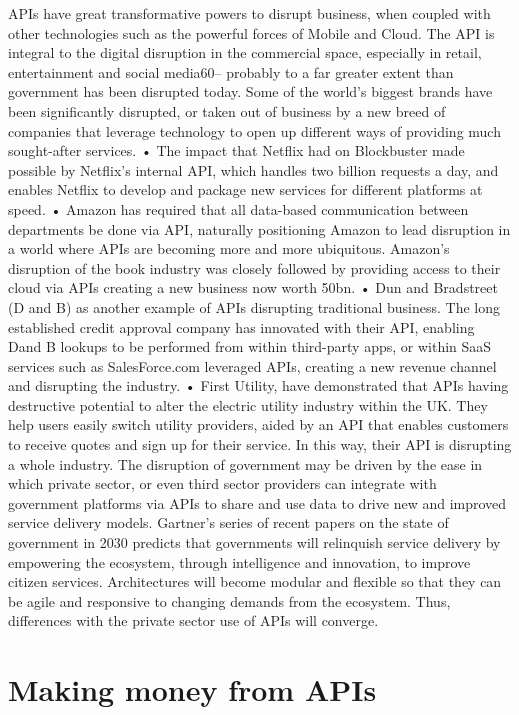 APIs have great transformative powers to disrupt business, when coupled with other technologies such as
the powerful forces of Mobile and Cloud. The API is integral to the digital disruption in the commercial
space, especially in retail, entertainment and social media60– probably to a far greater extent than
government has been disrupted today. Some of the world’s biggest brands have been significantly
disrupted, or taken out of business by a new breed of companies that leverage technology to open up
different ways of providing much sought-after services.
• The impact that Netflix had on Blockbuster made possible by Netflix’s internal API, which handles
two billion requests a day, and enables Netflix to develop and package new services for different
platforms at speed.
• Amazon has required that all data-based communication between departments be done via API,
naturally positioning Amazon to lead disruption in a world where APIs are becoming more and
more ubiquitous. Amazon’s disruption of the book industry was closely followed by providing
access to their cloud via APIs creating a new business now worth 50bn.
• Dun and Bradstreet (D and B) as another example of APIs disrupting traditional business. The long
established credit approval company has innovated with their API, enabling Dand B lookups to be 
performed from within third-party apps, or within SaaS services such as SalesForce.com leveraged
APIs, creating a new revenue channel and disrupting the industry.
• First Utility, have demonstrated that APIs having destructive potential to alter the electric utility
industry within the UK. They help users easily switch utility providers, aided by an API that enables
customers to receive quotes and sign up for their service. In this way, their API is disrupting a
whole industry.
The disruption of government may be driven by the ease in which private sector, or even third sector
providers can integrate with government platforms via APIs to share and use data to drive new and
improved service delivery models. Gartner’s series of recent papers on the state of government in 2030
predicts that governments will relinquish service delivery by empowering the ecosystem, through
intelligence and innovation, to improve citizen services. Architectures will become modular and flexible so
that they can be agile and responsive to changing demands from the ecosystem. Thus, differences with the
private sector use of APIs will converge.

\section{Making money from APIs}

